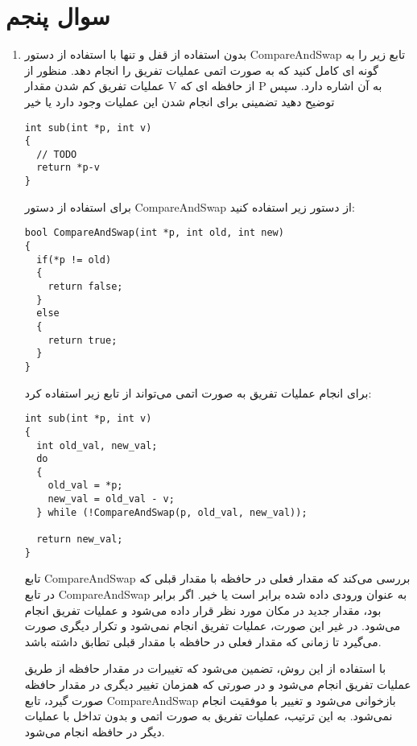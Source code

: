 \section{سوال پنجم}

\begin{enumerate}
	\item بدون استفاده از قفل و تنها با استفاده از دستور CompareAndSwap تابع زیر را به گونه ای کامل کنید که به صورت اتمی عملیات تفریق را انجام دهد. منظور از عملیات تفریق کم شدن مقدار V از حافظه ای که P به آن اشاره دارد. سپس توضیح دهید تضمینی برای انجام شدن این عملیات وجود دارد یا خیر

\begin{latin}
\begin{lstlisting}
int sub(int *p, int v)
{
  // TODO
  return *p-v
}		
\end{lstlisting}
\end{latin}

برای استفاده از دستور CompareAndSwap از دستور زیر استفاده کنید:

\begin{latin}
\begin{lstlisting}
bool CompareAndSwap(int *p, int old, int new)
{
  if(*p != old)
  {
  	return false;
  }
  else
  {
  	return true;
  }
}
\end{lstlisting}
\end{latin}


\begin{qsolve}
	برای انجام عملیات تفریق به صورت اتمی می‌تواند از تابع زیر استفاده کرد:
\begin{latin}
\begin{lstlisting}
int sub(int *p, int v)
{
  int old_val, new_val;
  do
  {
  	old_val = *p;
  	new_val = old_val - v;
  } while (!CompareAndSwap(p, old_val, new_val));
  
  return new_val;
}
\end{lstlisting}
\end{latin}

تابع CompareAndSwap بررسی می‌کند که مقدار فعلی در حافظه با مقدار قبلی که در تابع CompareAndSwap به عنوان ورودی داده شده برابر است یا خیر. اگر برابر بود، مقدار جدید در مکان مورد نظر قرار داده می‌شود و عملیات تفریق انجام می‌شود. در غیر این صورت، عملیات تفریق انجام نمی‌شود و تکرار دیگری صورت می‌گیرد تا زمانی که مقدار فعلی در حافظه با مقدار قبلی تطابق داشته باشد.

با استفاده از این روش، تضمین می‌شود که تغییرات در مقدار حافظه از طریق عملیات تفریق انجام می‌شود و در صورتی که همزمان تغییر دیگری در مقدار حافظه صورت گیرد، تابع CompareAndSwap بازخوانی می‌شود و تغییر با موفقیت انجام نمی‌شود. به این ترتیب، عملیات تفریق به صورت اتمی و بدون تداخل با عملیات دیگر در حافظه انجام می‌شود.
\end{qsolve}





\end{enumerate}
